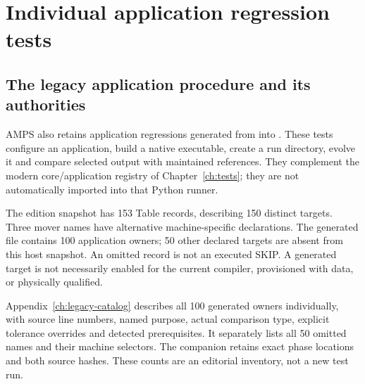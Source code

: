 \chapter{Individual application regression tests}\label{ch:application-regression}
\section{The legacy application procedure and its authorities}
AMPS also retains application regressions generated from
 into . These tests configure an
application, build a native executable, create a run directory, evolve it and
compare selected output with maintained references. They complement the
modern core/application registry of Chapter~\ref{ch:tests}; they are not
automatically imported into that Python runner.

The edition snapshot has 153 Table records, describing 150 distinct targets.
Three mover names have alternative machine-specific declarations. The
generated  file contains 100 application owners;
50 other declared targets are absent from this host snapshot.
An omitted record is not an executed SKIP. A generated target is not
necessarily enabled for the current compiler, provisioned with data, or
physically qualified.

Appendix~\ref{ch:legacy-catalog} describes all 100 generated owners
individually, with source line numbers, named purpose, actual comparison type,
explicit tolerance overrides and detected prerequisites. It separately lists
all 50 omitted names and their machine selectors. The companion
 retains exact phase locations and both
source hashes. These counts are an editorial inventory, not a new test run.


